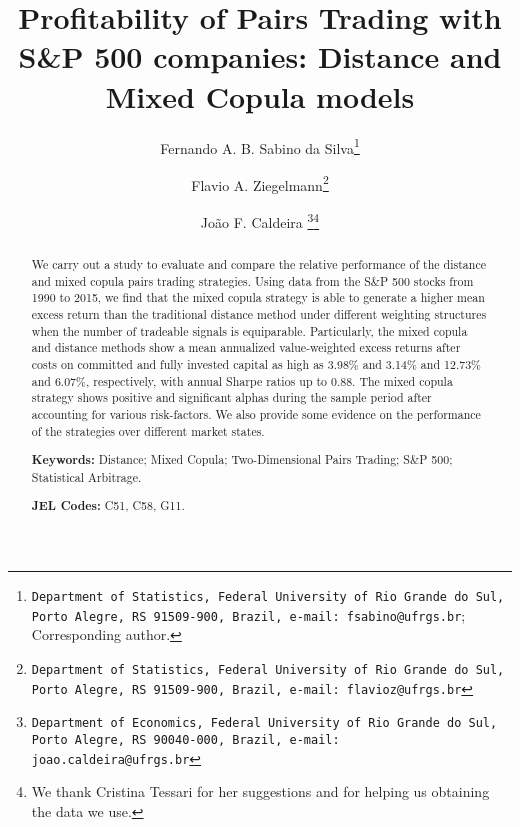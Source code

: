 \documentclass[a4paper]{article}
\begin{document}
	
	
	\makeatletter
	\def\@maketitle{%
		\newpage
		\null
		\vskip 2em%
		\begin{center}%
			\let \footnote \thanks
			{\Large\bfseries \@title \par}%
			\vskip 1.5em%
			{\normalsize
				\lineskip .5em%
				\begin{tabular}[t]{c}%
					\@author
				\end{tabular}\par}%
			\vskip 1em%
			{\normalsize \@date}%
		\end{center}%
		\par
		\vskip 1.5em}
	\makeatother
	
	\title{Profitability of Pairs Trading with S\&P 500 companies: Distance and Mixed Copula models}
	\author[]{ Fernando A. B. Sabino da Silva\thanks{\texttt{Department of Statistics, Federal University of Rio Grande do Sul, Porto Alegre, RS 91509-900, Brazil, e-mail: fsabino@ufrgs.br}; Corresponding author.}}
	\author[]{Flavio A. Ziegelmann\thanks{\texttt{Department of Statistics, Federal University of Rio Grande do Sul, Porto Alegre, RS 91509-900, Brazil, e-mail: flavioz@ufrgs.br}}}
	\author[]{João F. Caldeira \thanks{\texttt{Department of Economics, Federal University of Rio Grande do Sul, Porto Alegre, RS 90040-000, Brazil, e-mail: joao.caldeira@ufrgs.br}}\thanks{We thank Cristina Tessari for her suggestions and for helping us obtaining the data we use.}}
	\affil[]{}
	\date{}
	\maketitle
	
	
	\begin{abstract}
		We carry out a study to evaluate and compare the relative performance of the distance and mixed copula pairs trading strategies. Using data from the S\&P 500 stocks from 1990 to 2015, we find that the mixed copula strategy is able to generate a higher mean excess return than the traditional distance method under different weighting structures when the number of tradeable signals is equiparable. Particularly, the mixed copula and distance methods show a mean annualized value-weighted excess returns after costs on committed and fully invested capital as high as 3.98\% and 3.14\% and 12.73\% and 6.07\%, respectively, with annual Sharpe ratios up to 0.88. The mixed copula strategy shows positive and significant alphas during the sample period after accounting for various risk-factors. We also provide some evidence on the performance of the strategies over different market states. 
		
		\smallskip
		
		\noindent \textbf{Keywords:} Distance; Mixed Copula; Two-Dimensional Pairs Trading; S\&P 500; Statistical Arbitrage.
		
		\noindent \textbf{JEL Codes:} C51, C58, G11.
	\end{abstract}
	
\end{document}

